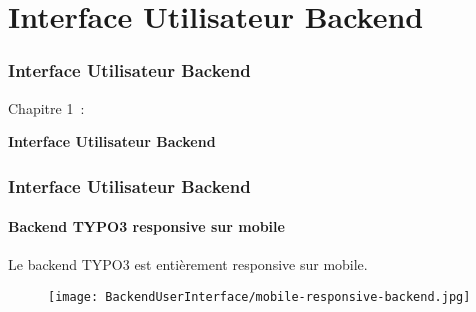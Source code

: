 %

\section{Interface Utilisateur Backend}
\begin{frame}[fragile]
	\frametitle{Interface Utilisateur Backend}

	\begin{center}\huge{Chapitre 1~:}\end{center}
	\begin{center}\huge{\color{typo3darkgrey}\textbf{Interface Utilisateur Backend}}\end{center}

\end{frame}


\begin{frame}[fragile]
	\frametitle{Interface Utilisateur Backend}
	\framesubtitle{Backend TYPO3 responsive sur mobile}

	Le backend TYPO3 est entièrement responsive sur mobile.

	\begin{figure}
		\texttt{[image: BackendUserInterface/mobile-responsive-backend.jpg]}
	\end{figure}

\end{frame}


